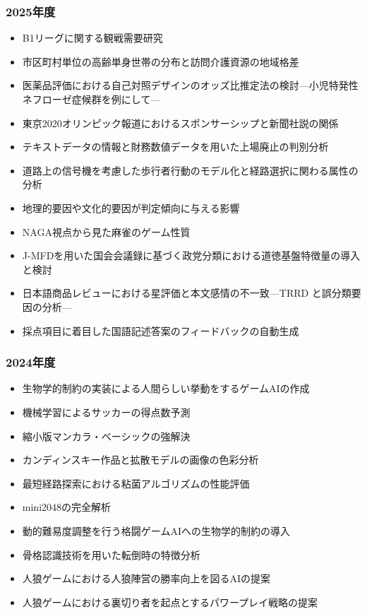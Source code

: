 \documentclass[paper=a4paper,fontsize=10.4pt]{jlreq}
\begin{document}
\begin{tcolorbox}[
colframe=gray, colback=white,
coltitle=white, colbacktitle=gray,
boxrule=0.8pt, arc=0mm,
outer arc=0mm,
sharp corners,
fonttitle=\bfseries,
enhanced,
attach boxed title to top left={xshift=5mm,yshift=-3mm},
boxed title style={frame hidden},
title=過去の卒業研究題目（過去3期分）
]
\begin{multicols}{2}
\fontsize{8bp}{11pt}\selectfont
\subsubsection*{2025年度}
\begin{itemize}[leftmargin=3mm]
  \item B1リーグに関する観戦需要研究
  \item 市区町村単位の高齢単身世帯の分布と訪問介護資源の地域格差
  \item 医薬品評価における自己対照デザインのオッズ比推定法の検討---小児特発性ネフローゼ症候群を例にして---
  \item 東京2020オリンピック報道におけるスポンサーシップと新聞社説の関係
  \item テキストデータの情報と財務数値データを用いた上場廃止の判別分析
  \item 道路上の信号機を考慮した歩行者行動のモデル化と経路選択に関わる属性の分析
  \item 地理的要因や文化的要因が判定傾向に与える影響
  \item NAGA視点から見た麻雀のゲーム性質
  \item J-MFDを用いた国会会議録に基づく政党分類における道徳基盤特徴量の導入と検討
  \item 日本語商品レビューにおける星評価と本文感情の不一致---TRRD と誤分類要因の分析---
  \item 採点項目に着目した国語記述答案のフィードバックの自動生成
\end{itemize}
\subsubsection*{2024年度}
\begin{itemize}[leftmargin=3mm]
  \item 生物学的制約の実装による人間らしい挙動をするゲームAIの作成
  \item 機械学習によるサッカーの得点数予測
  \item 縮小版マンカラ・ベーシックの強解決
  \item カンディンスキー作品と拡散モデルの画像の色彩分析
  \item 最短経路探索における粘菌アルゴリズムの性能評価
  \item mini2048の完全解析
  \item 動的難易度調整を行う格闘ゲームAIへの生物学的制約の導入
  \item 骨格認識技術を用いた転倒時の特徴分析
  \item 人狼ゲームにおける人狼陣営の勝率向上を図るAIの提案
  \item 人狼ゲームにおける裏切り者を起点とするパワープレイ戦略の提案
\end{itemize}

\end{multicols}
\end{tcolorbox}
\end{document}
